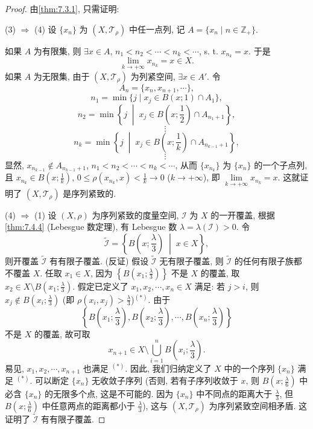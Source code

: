 \begin{proof}
由\cref{thm:7.3.1}, 只需证明:

(3) $\Rightarrow$ (4) 设 $\{x_{n}\}$ 为 $(X, \mathcal{T}_{\rho})$ 中任一点列, 记 $A = \{x_{n} \mid n \in \mathbb{Z}_{+}\}$.

如果 $A$ 为有限集, 则 $\exists x \in A$, $n_{1} < n_{2} < \cdots < n_{k} < \cdots$, s. t. $x_{n_{k}} = x$. 于是
\[
  \lim_{k \to +\infty} x_{n_{k}} = x \in X.
\]
如果 $A$ 为无限集, 由于 $(X, \mathcal{T}_{\rho})$ 为列紧空间, $\exists x \in A'$. 令
\[
  A_{n} = \{x_{n}, x_{n+1}, \cdots\},
\]
\[
  n_{1} = \min\{j \mid x_{j} \in B(x; 1) \cap A_{1}\},
\]
\[
  n_{2} = \min\left\{j \;\middle|\; x_{j} \in B\left(x; \frac{1}{2}\right) \cap A_{n_{1}+1}\right\},
\]
\[
  \qquad \vdots
\]
\[
  n_{k} = \min\left\{j \;\middle|\; x_{j} \in B\left(x; \frac{1}{k}\right) \cap A_{n_{k-1}+1}\right\},
\]
\[
  \qquad \vdots
\]
显然, $x_{n_{k-1}} \notin A_{n_{k-1}+1}$, $n_{1} < n_{2} < \cdots < n_{k} < \cdots$, 从而 $\{x_{n_{k}}\}$ 为 $\{x_{n}\}$ 的一个子点列, 且 $x_{n_{k}} \in B\left(x; \frac{1}{k}\right)$, $0 \leqslant \rho\left(x_{n_{k}}, x\right) < \frac{1}{k} \to 0$ ($k \to +\infty$), 即 $\lim\limits_{k \to +\infty} x_{n_{k}} = x$. 这就证明了 $(X, \mathcal{T}_{\rho})$ 是序列紧致的.

(4) $\Rightarrow$ (1) 设 $(X, \rho)$ 为序列紧致的度量空间, $\mathcal{I}$ 为 $X$ 的一开覆盖, 根据\cref{thm:7.4.4} (Lebesgue 数定理), 有 Lebesgue 数 $\lambda = \lambda(\mathcal{I}) > 0$. 令
\[
  \widetilde{\mathcal{I}} = \left\{B\left(x; \frac{\lambda}{3}\right) \;\middle|\; x \in X\right\},
\]
则开覆盖 $\widetilde{\mathcal{I}}$ 有有限子覆盖. (反证) 假设 $\widetilde{\mathcal{I}}$ 无有限子覆盖, 则 $\widetilde{\mathcal{I}}$ 的任何有限子族都不覆盖 $X$. 任取 $x_{1} \in X$, 因为 $\left\{B\left(x_{1}; \frac{\lambda}{3}\right)\right\}$ 不是 $X$ 的覆盖, 取 $x_{2} \in X \setminus B\left(x_{1}; \frac{\lambda}{3}\right)$. 假定已定义了 $x_{1}, x_{2}, \cdots, x_{n} \in X$ 满足: 若 $j > i$, 则 $x_{j} \notin B\left(x_{i}; \frac{\lambda}{3}\right)$ (即 $\rho\left(x_{i}, x_{j}\right) > \frac{\lambda}{3}$)$^{(*)}$. 由于
\[
  \left\{B\left(x_{1}; \frac{\lambda}{3}\right), B\left(x_{2}; \frac{\lambda}{3}\right), \cdots, B\left(x_{n}; \frac{\lambda}{3}\right)\right\}
\]
不是 $X$ 的覆盖, 故可取
\[
  x_{n+1} \in X \setminus \bigcup_{i=1}^{n} B\left(x_{i}; \frac{\lambda}{3}\right).
\]
易见, $x_{1}, x_{2}, \cdots, x_{n+1}$ 也满足 $^{(*)}$. 因此, 我们归纳定义了 $X$ 中的一个序列 $\{x_{n}\}$ 满足 $^{(*)}$. 可以断定 $\{x_{n}\}$ 无收敛子序列 (否则, 若有子序列收敛于 $x$, 则 $B\left(x; \frac{\lambda}{6}\right)$ 中必含 $\{x_{n}\}$ 的无限多个点, 这是不可能的. 因为 $\{x_{n}\}$ 中不同点的距离大于 $\frac{\lambda}{3}$, 但 $B\left(x; \frac{\lambda}{6}\right)$ 中任意两点的距离都小于 $\frac{\lambda}{3}$), 这与 $(X, \mathcal{T}_{\rho})$ 为序列紧致空间相矛盾. 这证明了 $\widetilde{\mathcal{I}}$ 有有限子覆盖.


\end{proof}
